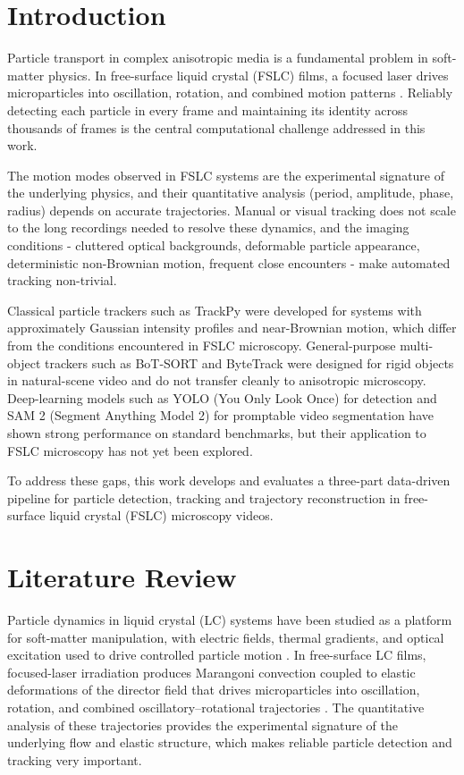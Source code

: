 \documentclass[conference]{IEEEtran}
\begin{document}
\section{Introduction}
Particle transport in complex anisotropic media is a fundamental problem in soft-matter physics. In free-surface liquid crystal (FSLC) films, a focused laser drives microparticles into oscillation, rotation, and combined motion patterns \cite{shvetsov2024}. Reliably detecting each particle in every frame and maintaining its identity across thousands of frames is the central computational challenge addressed in this work.

The motion modes observed in FSLC systems are the experimental signature of the underlying physics, and their quantitative analysis (period, amplitude, phase, radius) depends on accurate trajectories. Manual or visual tracking does not scale to the long recordings needed to resolve these dynamics, and the imaging conditions - cluttered optical backgrounds, deformable particle appearance, deterministic non-Brownian motion, frequent close encounters - make automated tracking non-trivial.

Classical particle trackers such as TrackPy \cite{allan2021_trackpy} were developed for systems with approximately Gaussian intensity profiles and near-Brownian motion, which differ from the conditions encountered in FSLC microscopy. General-purpose multi-object trackers such as BoT-SORT \cite{aharon2022_botsort} and ByteTrack \cite{sheng2023_yolov7_bytetrack} were designed for rigid objects in natural-scene video and do not transfer cleanly to anisotropic microscopy. Deep-learning models such as YOLO (You Only Look Once) \cite{vijayakumar2024_yolo_review} for detection and SAM 2 (Segment Anything Model 2) \cite{ravi2025_sam2} for promptable video segmentation have shown strong performance on standard benchmarks, but their application to FSLC microscopy has not yet been explored. 

To address these gaps, this work develops and evaluates a three-part data-driven pipeline for particle detection, tracking and trajectory reconstruction in free-surface liquid crystal (FSLC) microscopy videos. 


\section{Literature Review}
Particle dynamics in liquid crystal (LC) systems have been studied as a platform for soft-matter manipulation, with electric fields, thermal gradients, and optical excitation used to drive controlled particle motion \cite{lavrentovich2014_transport_particles_lc}. In free-surface LC films, focused-laser irradiation produces Marangoni convection coupled to elastic deformations of the director field that drives microparticles into oscillation, rotation, and combined oscillatory–rotational trajectories \cite{shvetsov2024}. The quantitative analysis of these trajectories provides the experimental signature of the underlying flow and elastic structure, which makes reliable particle detection and tracking very important.
\end{document}
